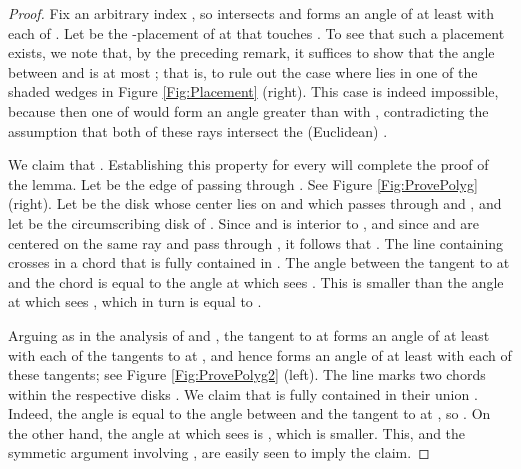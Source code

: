 \documentclass[letter,11pt]{article}
\begin{document}
\begin{proof}
Fix an arbitrary index , so  intersects  
and forms an angle of at least  with each of .
Let  be the -placement of 
at  that touches . To see that such a placement exists, we note that, by the preceding remark, it suffices to show that the angle between
 and  is at most ; that is, to rule out the case where  lies in one of the shaded wedges in Figure \ref{Fig:Placement} (right). This case is indeed impossible, because then one of  would form an angle greater than  with 
, contradicting the assumption that both of these rays intersect the (Euclidean) .

We claim that . 
Establishing this property for every  will complete 
the proof of the lemma. 
Let  be the edge of  passing through . See Figure \ref{Fig:ProvePolyg} (right). Let  be the disk 
whose center lies on  and which passes through  and , 
and let  be the circumscribing disk of . 
Since  and is interior to , and since  and 
 are centered on the same ray  and pass through , it 
follows that . 
The line  containing  crosses  in a chord  that
is fully contained in . The angle between the tangent to  at 
 and the chord  is equal to the angle at which  sees . 
This is smaller than the angle at which  sees , which in turn 
is equal to .

Arguing as in the analysis of  and , the tangent to  at  forms an angle of at least  with each of the tangents to  at , and hence  forms an angle of at least  with each of these tangents; see Figure \ref{Fig:ProvePolyg2} (left).
The line  marks two chords  within the respective disks . We claim that  is fully contained in their union . Indeed, the angle  is equal to the angle between  and the tangent to  at , so .
On the other hand, the angle at which  sees  is , which is smaller. This, and the symmetic argument involving , are easily seen to imply the claim.


\end{proof}
\end{document}

